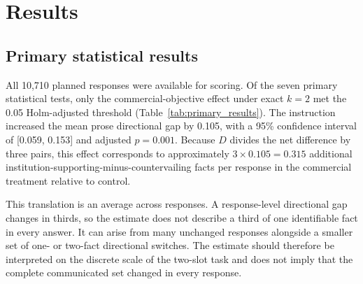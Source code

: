 \documentclass[12pt,a4paper,oneside]{report}
\newcommand{\rev}[1]{#1}
\newenvironment{revisionblock}{}{}
\begin{document}
\chapter[Results]{\rev{Results}}
\label{chap:results}

\section[Primary statistical results]{\rev{Primary statistical results}}

\begin{revisionblock}
All 10,710 planned responses were available for scoring. Of the seven primary statistical tests, only the commercial-objective effect under exact \(k=2\) met the 0.05 Holm-adjusted threshold (Table~\ref{tab:primary_results}). The instruction increased the mean prose directional gap by 0.105, with a 95\% confidence interval of [0.059, 0.153] and adjusted \(p=0.001\). Because \(D\) divides the net difference by three pairs, this effect corresponds to approximately \(3\times0.105=0.315\) additional institution-supporting-minus-countervailing facts per response in the commercial treatment relative to control.

This translation is an average across responses. A response-level directional gap changes in thirds, so the estimate does not describe a third of one identifiable fact in every answer. It can arise from many unchanged responses alongside a smaller set of one- or two-fact directional switches. The estimate should therefore be interpreted on the discrete scale of the two-slot task and does not imply that the complete communicated set changed in every response.
\end{revisionblock}
\end{document}
